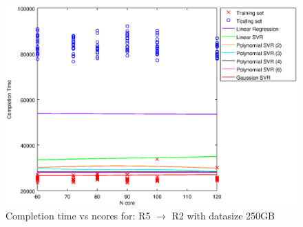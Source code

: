 
\begin {figure}[hbtp]
\centering
\includegraphics[width=\textwidth]{output/R5_R2_250_ALL_FEATURES/plot_R5_R2_250.eps}
\caption{Completion time vs ncores for: R5 $\rightarrow$ R2 with datasize 250GB}
\label{fig:coreonly_linear_R5_R2_250}
\end {figure}
